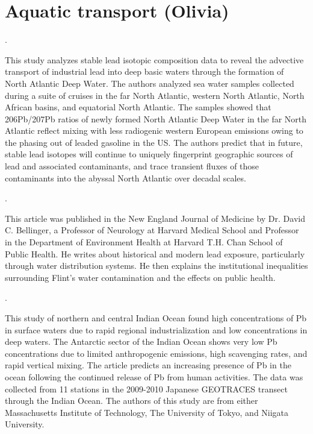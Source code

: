 \documentclass{article}\usepackage[]{graphicx}\usepackage[]{color}
\begin{document}
\section{Aquatic transport (Olivia)}

\noindent {} .


This study analyzes stable lead isotopic composition data to reveal the advective transport of industrial lead into deep basic waters through the formation of North Atlantic Deep Water. The authors analyzed sea water samples collected during a suite of cruises in the far North Atlantic, western North Atlantic, North African basins, and equatorial North Atlantic. The samples showed that 206Pb/207Pb ratios of newly formed North Atlantic Deep Water in the far North Atlantic reflect mixing with less radiogenic western European emissions owing to the phasing out of leaded gasoline in the US. The authors predict that in future, stable lead isotopes will continue to uniquely fingerprint geographic sources of lead and associated contaminants, and trace transient fluxes of those contaminants into the abyssal North Atlantic over decadal scales.


\noindent {} .


This article was published in the New England Journal of Medicine by Dr. David C. Bellinger, a Professor of Neurology at Harvard Medical School and Professor in the Department of Environment Health at Harvard T.H. Chan School of Public Health. He writes about historical and modern lead exposure, particularly through water distribution systems. He then explains the institutional inequalities surrounding Flint's water contamination and the effects on public health. 


\noindent {} .


This study of northern and central Indian Ocean found high concentrations of Pb in surface waters due to rapid regional industrialization and low concentrations in deep waters. The Antarctic sector of the Indian Ocean shows very low Pb concentrations due to limited anthropogenic emissions, high scavenging rates, and rapid vertical mixing. The article predicts an increasing presence of Pb in the ocean following the continued release of Pb from human activities. The data was collected from 11 stations in the 2009-2010 Japanese GEOTRACES transect through the Indian Ocean. The authors of this study are from either Massachusetts Institute of Technology, The University of Tokyo, and Niigata University. 
\end{document}
